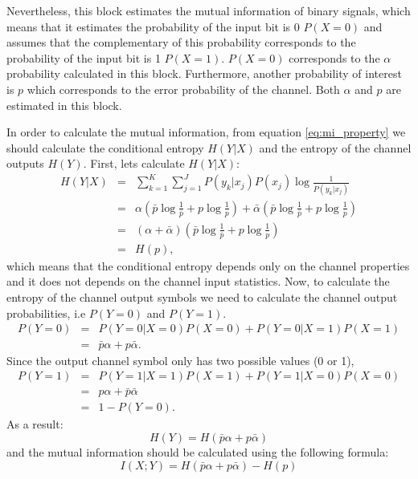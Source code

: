 \begin{refsection}
Nevertheless, this block estimates the mutual information of binary signals, which means that it estimates the probability of the input bit is 0 $P(X=0)$ and assumes that the complementary of this probability corresponds to the probability of the input bit is 1 $P(X=1)$. $P(X=0)$ corresponds to the $\alpha$ probability calculated in this block. Furthermore, another probability of interest is $p$ which corresponds to the error probability of the channel. Both $\alpha$ and $p$ are estimated in this block.

In order to calculate the mutual information, from equation \ref{eq:mi_property} we should calculate the conditional entropy $H(Y|X)$ and the entropy of the channel outputs $H(Y)$. First, lets calculate $H(Y|X)$:
\begin{eqnarray}
 \nonumber %
  H(Y|X)    &=& \sum_{k=1}^{K}\sum_{j=1}^{J}P(y_k|x_j)P(x_j)\log \frac{1}{P(y_k|x_j)} \\ \nonumber
            &=& \alpha (\bar{p} \log \frac{1}{\bar{p}} + p \log \frac{1}{p}) + \bar{\alpha}(\bar{p}\log \frac{1}{\bar{p}}+ p \log \frac{1}{p}) \\ \nonumber
            &=& (\alpha + \bar{\alpha})(\bar{p}\log\frac{1}{\bar{p}}+p \log\frac{1}{p}) \\
            &=& H(p),
\end{eqnarray}
which means that the conditional entropy depends only on the channel properties and it does not depends on the channel input statistics.
Now, to calculate the entropy of the channel output symbols we need to calculate the channel output probabilities, i.e $P(Y=0)$ and $P(Y=1)$.
\begin{eqnarray}
 \nonumber %
  P(Y=0)    &=& P(Y=0|X=0)P(X=0)+P(Y=0|X=1)P(X=1) \\
            &=& \bar{p}\alpha + p \bar{\alpha}.
\end{eqnarray}
Since the output channel symbol only has two possible values (0 or 1),
\begin{eqnarray}
 \nonumber %
  P(Y=1)    &=& P(Y=1|X=1)P(X=1) + P(Y=1|X=0)P(X=0) \\ \nonumber
            &=& p\alpha + \bar{p}\bar{\alpha} \\
            &=& 1 - P(Y=0).
\end{eqnarray}
As a result:
\begin{equation}\label{eq:entropyout}
  H(Y) = H(\bar{p}\alpha + p \bar{\alpha})
\end{equation}
and the mutual information should be calculated using the following formula:
\begin{equation}\label{eq:mi_final}
  I(X;Y) = H(\bar{p}\alpha + p \bar{\alpha}) - H(p)
\end{equation}


\end{refsection}
